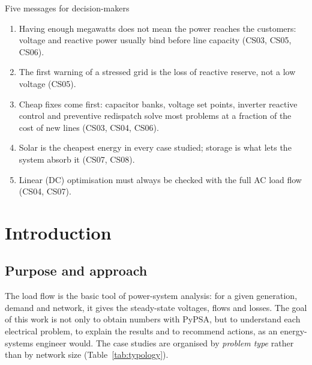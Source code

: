\documentclass[11pt,a4paper]{article}
\begin{document}
\begin{keybox}{Five messages for decision-makers}
\begin{enumerate}
\item Having enough megawatts does not mean the power reaches the customers: voltage and
      reactive power usually bind before line capacity (CS03, CS05, CS06).
\item The first warning of a stressed grid is the loss of reactive reserve, not a low voltage (CS05).
\item Cheap fixes come first: capacitor banks, voltage set points, inverter reactive control
      and preventive redispatch solve most problems at a fraction of the cost of new lines (CS03, CS04, CS06).
\item Solar is the cheapest energy in every case studied; storage is what lets the system absorb it (CS07, CS08).
\item Linear (DC) optimisation must always be checked with the full AC load flow (CS04, CS07).
\end{enumerate}
\end{keybox}

\clearpage
\section{Introduction}

\subsection{Purpose and approach}
The load flow is the basic tool of power-system analysis: for a given generation, demand and
network, it gives the steady-state voltages, flows and losses. The goal of this work is not
only to obtain numbers with PyPSA, but to understand each electrical problem, to explain the
results and to recommend actions, as an energy-systems engineer would. The case studies are
organised by \emph{problem type} rather than by network size (Table~\ref{tab:typology}).
\end{document}
